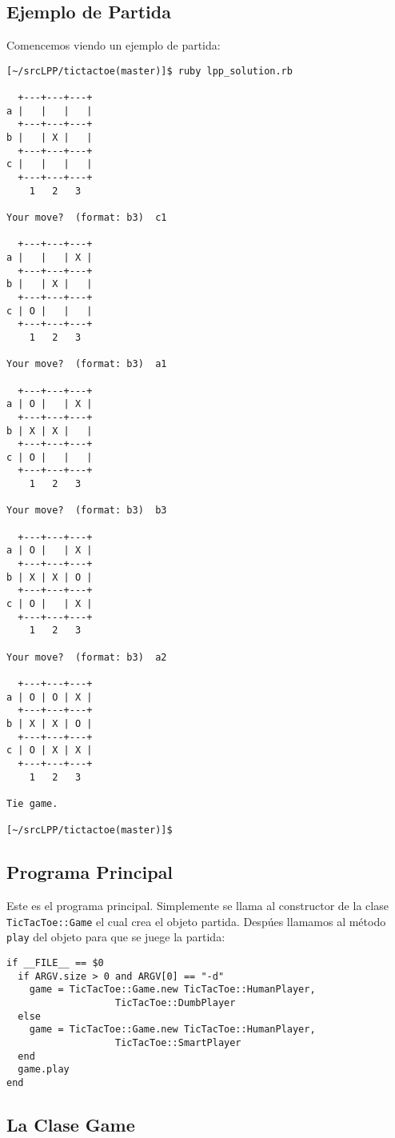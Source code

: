 \subsection{Ejemplo de Partida}
Comencemos viendo un ejemplo de partida:
\begin{verbatim}
[~/srcLPP/tictactoe(master)]$ ruby lpp_solution.rb 

  +---+---+---+
a |   |   |   |
  +---+---+---+
b |   | X |   |
  +---+---+---+
c |   |   |   |
  +---+---+---+
    1   2   3

Your move?  (format: b3)  c1

  +---+---+---+
a |   |   | X |
  +---+---+---+
b |   | X |   |
  +---+---+---+
c | O |   |   |
  +---+---+---+
    1   2   3

Your move?  (format: b3)  a1

  +---+---+---+
a | O |   | X |
  +---+---+---+
b | X | X |   |
  +---+---+---+
c | O |   |   |
  +---+---+---+
    1   2   3

Your move?  (format: b3)  b3

  +---+---+---+
a | O |   | X |
  +---+---+---+
b | X | X | O |
  +---+---+---+
c | O |   | X |
  +---+---+---+
    1   2   3

Your move?  (format: b3)  a2

  +---+---+---+
a | O | O | X |
  +---+---+---+
b | X | X | O |
  +---+---+---+
c | O | X | X |
  +---+---+---+
    1   2   3

Tie game.

[~/srcLPP/tictactoe(master)]$
\end{verbatim}

\subsection{Programa Principal}
Este es el programa principal. Simplemente se llama al constructor de la clase 
\verb|TicTacToe::Game| el cual crea el objeto partida. Despúes llamamos al método \verb|play|
del objeto para que se juege la partida:
\begin{verbatim}
if __FILE__ == $0
  if ARGV.size > 0 and ARGV[0] == "-d"
    game = TicTacToe::Game.new TicTacToe::HumanPlayer,
                   TicTacToe::DumbPlayer
  else
    game = TicTacToe::Game.new TicTacToe::HumanPlayer,
                   TicTacToe::SmartPlayer
  end 
  game.play
end
\end{verbatim}

\subsection{La Clase Game}

